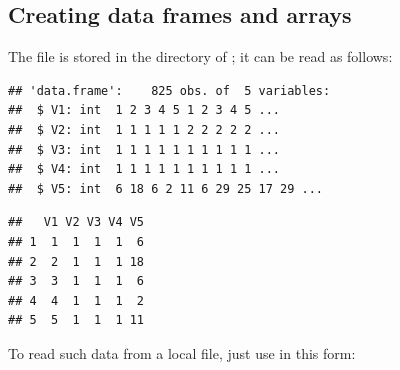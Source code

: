 \documentclass[11pt]{book}
\renewenvironment{knitrout}{\small\renewcommand{\baselinestretch}{.85}}{} %
\begin{document}
\subsection{Creating data frames and arrays}
The file  is stored in the  directory
of ; it can be read as follows:
\begin{knitrout}
\color{fgcolor}\begin{kframe}
\begin{alltt}
\hlkwb{<-}\hlstd{(}\hlstd{(}\hlstd{,}\hlstd{,}\hlstd{,}\hlstd{=}\hlstd{))}
\end{alltt}
\begin{verbatim}
## 'data.frame':	825 obs. of  5 variables:
##  $ V1: int  1 2 3 4 5 1 2 3 4 5 ...
##  $ V2: int  1 1 1 1 1 2 2 2 2 2 ...
##  $ V3: int  1 1 1 1 1 1 1 1 1 1 ...
##  $ V4: int  1 1 1 1 1 1 1 1 1 1 ...
##  $ V5: int  6 18 6 2 11 6 29 25 17 29 ...
\end{verbatim}
\begin{alltt}
\hlstd{)}
\end{alltt}
\begin{verbatim}
##   V1 V2 V3 V4 V5
## 1  1  1  1  1  6
## 2  2  1  1  1 18
## 3  3  1  1  1  6
## 4  4  1  1  1  2
## 5  5  1  1  1 11
\end{verbatim}
\end{kframe}
\end{knitrout}
To read such data from a local file, just use  in this form:
\begin{knitrout}
\color{fgcolor}\begin{kframe}
\begin{alltt}
\hlkwb{<-}\hlstd{(}\hlstd{)}
\end{alltt}
\end{kframe}
\end{knitrout}
\end{document}
